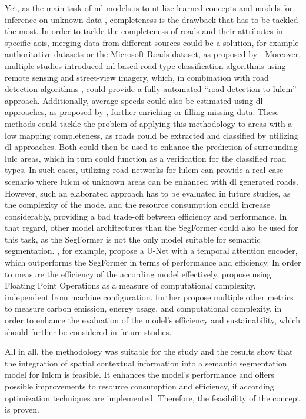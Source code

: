 Yet, as the main task of \gls{ml} models is to utilize learned concepts and models for inference on unknown data \autocite{Sarker2021,Shinde.Shah2018}, completeness is the drawback that has to be tackled the most. In order to tackle the completeness of roads and their attributes in specific \glspl{aoi}, merging data from different sources could be a solution, for example authoritative datasets or the Microsoft Roads dataset, as proposed by \textcite{Anderson.Sarkar.ea2019,Srivastava.VargasMunoz.ea2019,Vargas-Munoz.Srivastava.ea2021}. Moreover, multiple studies introduced \gls{ml} based road type classification algorithms \autocite{Alghanim.Jilani.ea2021,Zhao.Ning.ea2023} using remote sensing and street-view imagery, which, in combination with road detection algorithms \autocite{Abdollahi.Pradhan.ea2020,Chen.Deng.ea2022}, could provide a fully automated \enquote{road detection to \gls{lulcm}} approach. Additionally, average speeds could also be estimated using \gls{dl} approaches, as proposed by \textcite{Keller.Gabriel.ea2020}, further enriching or filling missing data. These methods could tackle the problem of applying this methodology to areas with a low mapping completeness, as roads could be extracted and classified by utilizing \gls{dl} approaches. Both could then be used to enhance the prediction of surrounding \gls{lulc} areas, which in turn could function as a verification for the classified road types. In such cases, utilizing road networks for \gls{lulcm} can provide a real case scenario where \gls{lulcm} of unknown areas can be enhanced with \gls{dl} generated roads. However, such an elaborated approach has to be evaluated in future studies, as the complexity of the model and the resource consumption could increase considerably, providing a bad trade-off between efficiency and performance. In that regard, other model architectures than the SegFormer could also be used for this task, as the SegFormer is not the only model suitable for semantic segmentation. \textcite{Tzepkenlis.Marthoglou.ea2023}, for example, propose a U-Net with a temporal attention encoder, which outperforms the SegFormer in terms of performance and efficiency. In order to measure the efficiency of the according model effectively, \textcite{Desislavov.Martinez-Plumed.ea2023,Getzner.Charpentier.ea2023} propose using Floating Point Operations as a measure of computational complexity, independent from machine configuration. \textcite{Mehlin.Schacht.ea2023} further propose multiple other metrics to measure carbon emission, energy usage, and computational complexity, in order to enhance the evaluation of the model's efficiency and sustainability, which should further be considered in future studies.

All in all, the methodology was suitable for the study and the results show that the integration of spatial contextual information into a semantic segmentation model for \gls{lulcm} is feasible. It enhances the model's performance and offers possible improvements to resource consumption and efficiency, if according optimization techniques are implemented. Therefore, the feasibility of the concept is proven.
